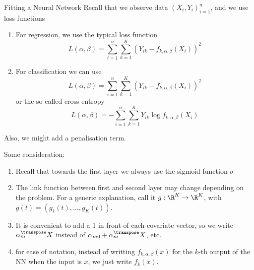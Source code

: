 \documentclass[9pt,xcolor=table]{beamer}
\begin{document}
\begin{frame}{Fitting a Neural Network}
Recall that we observe data $(X_i,Y_i)_{i=1}^n$, and we use loss functions

\begin{enumerate}
\item For regression, we use the typical loss function
$$L(\alpha,\beta) = \sum_{i=1}^n \sum_{k=1}^K (Y_{ik}-f_{k, \alpha,\beta}(X_i))^2$$
\item For classification we can use 
$$L(\alpha,\beta) = \sum_{i=1}^n \sum_{k=1}^K (Y_{ik}-f_{k,\alpha,\beta}(X_i))^2$$
or the so-called cross-entropy
$$L(\alpha,\beta) = -\sum_{i=1}^n \sum_{k=1}^K Y_{ik} \log f_{k,\alpha,\beta}(X_i)$$
\end{enumerate}

Also, we might add a penalisation term.
\end{frame}

\begin{frame}
Some consideration:
\begin{enumerate}
\item Recall that towards the first layer we always use the sigmoid function $\sigma$
\item The link function between first and second layer may change depending on the problem. For a generic explanation, call it $g:\R^K \to \R^K$, with $g(t) = (g_1(t),\ldots, g_K(t))$.
\item It is convenient to add a 1 in front of each covariate vector, so we write $\alpha_m^{\transpose} X$ instead of $\alpha_{m0}+ \alpha_m^{\transpose} X$, etc.
\item for ease of notation, instead of writting $f_{k,\alpha,\beta}(x)$ for the $k$-th output of the NN when the input is $x$, we just write $f_k(x)$.
\end{enumerate}

\end{frame}
\end{document}
